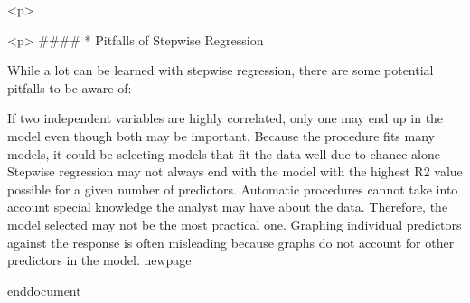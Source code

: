 <p>


<p>
####        * {Pitfalls of Stepwise Regression}

While a lot can be learned with stepwise regression, there are some potential pitfalls to be aware of:

If two independent variables are highly correlated, only one may end up in the model even though both may be important.
Because the procedure fits many models, it could be selecting models that fit the data well due to chance alone
Stepwise regression may not always end with the model with the highest R2 value possible for a given number of predictors.
Automatic procedures cannot take into account special knowledge the analyst may have about the data. Therefore, the model selected may not be the most practical one.
Graphing individual predictors against the response is often misleading because graphs do not account for other predictors in the model.
newpage



end{document}
